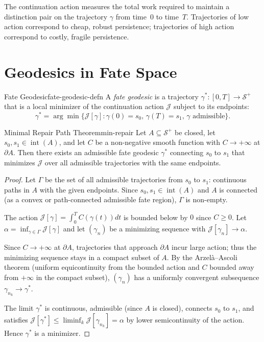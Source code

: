 \documentclass[12pt,twoside,openright]{book}
\newcommand{\fateSpace}{\mathcal{S}}
\newcommand{\admRegion}{A}
\providecommand{\fatePos}{\fateSpace^{+}}
\providecommand{\admRegion}{A}
\providecommand{\contCost}{C}
\providecommand{\contAction}{\mathcal{J}}
\providecommand{\fateTraj}{\gamma}
\providecommand{\fateGeo}{\fateTraj^{*}}
\begin{document}
The continuation action measures the total work required to
maintain a distinction pair on the trajectory $\fateTraj$ from
time~$0$ to time~$T$. Trajectories of low action correspond to
cheap, robust persistence; trajectories of high action correspond
to costly, fragile persistence.

\section{Geodesics in Fate Space}

\begin{definition}{Fate Geodesic}{fate-geodesic-defn}
A \emph{fate geodesic} is a trajectory
$\fateGeo:[0,T]\to\fatePos$ that is a local minimizer of the
continuation action $\contAction$ subject to its endpoints:
\[
  \fateGeo = \arg\min\bigl\{
    \contAction[\fateTraj] : \fateTraj(0)=s_0,\,\fateTraj(T)=s_1,\,
    \fateTraj\text{ admissible}
  \bigr\}.
\]
\end{definition}

\begin{theorem}{Minimal Repair Path Theorem}{min-repair}
Let $\admRegion\subseteq\fatePos$ be closed, let
$s_0,s_1\in\operatorname{int}(\admRegion)$, and let $\contCost$
be a non-negative smooth function with $\contCost\to+\infty$
at $\partial\admRegion$. Then there exists an admissible fate
geodesic $\fateGeo$ connecting $s_0$ to $s_1$ that minimizes
$\contAction$ over all admissible trajectories with the same
endpoints.
\begin{proof}
Let $\Gamma$ be the set of all admissible trajectories from
$s_0$ to $s_1$: continuous paths in $\admRegion$ with the
given endpoints. Since $s_0,s_1\in\operatorname{int}(\admRegion)$
and $\admRegion$ is connected (as a convex or path-connected
admissible fate region), $\Gamma$ is non-empty.

The action $\contAction[\fateTraj]=\int_0^T\contCost(\fateTraj(t))dt$
is bounded below by $0$ since $\contCost\ge 0$. Let
$\alpha=\inf_{\fateTraj\in\Gamma}\contAction[\fateTraj]$ and
let $(\fateTraj_n)$ be a minimizing sequence with
$\contAction[\fateTraj_n]\to\alpha$.

Since $\contCost\to+\infty$ at $\partial\admRegion$, trajectories
that approach $\partial\admRegion$ incur large action; thus the
minimizing sequence stays in a compact subset of $\admRegion$.
By the Arzel\`{a}--Ascoli theorem (uniform equicontinuity from
the bounded action and $\contCost$ bounded away from $+\infty$
in the compact subset), $(\fateTraj_n)$ has a uniformly
convergent subsequence $\fateTraj_{n_k}\to\fateGeo$.

The limit $\fateGeo$ is continuous, admissible (since $\admRegion$
is closed), connects $s_0$ to $s_1$, and satisfies
$\contAction[\fateGeo]\le\liminf_k\contAction[\fateTraj_{n_k}]=\alpha$
by lower semicontinuity of the action. Hence $\fateGeo$ is a
minimizer.
\end{proof}
\end{theorem}
\end{document}
